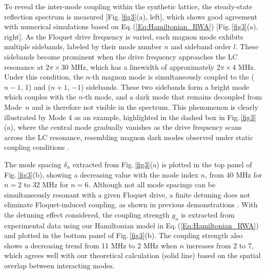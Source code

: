 \documentclass[
twocolumn,

superscriptaddress,









 amsmath,amssymb,
 aps,


prl,




]{revtex4-2}
\begin{document}
To reveal the inter-mode coupling within the synthetic lattice, the steady-state reflection spectrum is measured [Fig.\,\ref{fig3}(a), left], which shows good agreement with numerical simulations based on Eq.\,(\ref{Eq:Hamiltonian_RWA}) [Fig.\,\ref{fig3}(a), right]. As the Floquet drive frequency is varied, each magnon mode exhibits multiple sidebands, labeled by their mode number $n$ and sideband order $l$. These sidebands become prominent when the drive frequency approaches the LC resonance at $2\pi\times 30$ MHz, which has a linewidth of approximately $2\pi\times 4$ MHz. Under this condition, the $n$-th magnon mode is simultaneously coupled to the ($n{-}1$, 1) and ($n{+}1$, $-1$) sidebands. These two sidebands form a bright mode which couples with the $n$-th mode, and a dark mode that remains decoupled from Mode~$n$ and is therefore not visible in the spectrum. This phenomenon is clearly illustrated by Mode 4 as an example, highlighted in the dashed box in Fig.\,\ref{fig3}(a), where the central mode gradually vanishes as the drive frequency scans across the LC resonance, resembling magnon dark modes observed under static coupling conditions \cite{Zhang2015MagnonDarkMode}.




The mode spacing $\delta_n$ extracted from Fig.\,\ref{fig3}(a) is plotted in the top panel of Fig.\,\ref{fig3}(b), showing a decreasing value with the mode index $n$, from 40 MHz for $n = 2$ to 32 MHz for $n = 6$. Although not all mode spacings can be simultaneously resonant with a given Floquet drive, a finite detuning does not eliminate Floquet-induced coupling, as shown in previous demonstrations \cite{FloquetCavityElectromagnonics, Pishehvar_PRAppl_2025_resonance}. With the detuning effect considered, the coupling strength $g_n$ is extracted from experimental data using our Hamiltonian model in Eq.\,(\ref{Eq:Hamiltonian_RWA}) and plotted in the bottom panel of Fig.\,\ref{fig3}(b). The coupling strength also shows a decreasing trend from 11 MHz to 2 MHz when $n$ increases from 2 to 7, which agrees well with our theoretical calculation (solid line) based on the spatial overlap between interacting modes.
\end{document}

